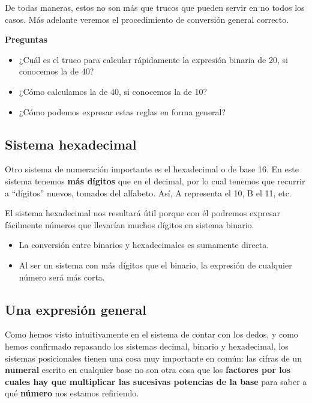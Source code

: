 \documentclass[spanish,a4paper,]{article}
\providecommand{\tightlist}{%
  \setlength{\itemsep}{0pt}\setlength{\parskip}{0pt}}
\begin{document}
De todas maneras, estos no son más que trucos que pueden servir en no
todos los casos. Más adelante veremos el procedimiento de conversión
general correcto.

\textbf{Preguntas}

\begin{itemize}
\tightlist
\item
  ¿Cuál es el truco para calcular rápidamente la expresión binaria de
  20, si conocemos la de 40?
\item
  ¿Cómo calculamos la de 40, si conocemos la de 10?
\item
  ¿Cómo podemos expresar estas reglas en forma general?
\end{itemize}

\hypertarget{sistema-hexadecimal}{%
\subsection{Sistema hexadecimal}\label{sistema-hexadecimal}}

Otro sistema de numeración importante es el hexadecimal o de base 16. En
este sistema tenemos \textbf{más dígitos} que en el decimal, por lo cual
tenemos que recurrir a ``dígitos'' nuevos, tomados del alfabeto. Así, A
representa el 10, B el 11, etc.

El sistema hexadecimal nos resultará útil porque con él podremos
expresar fácilmente números que llevarían muchos dígitos en sistema
binario.

\begin{itemize}
\tightlist
\item
  La conversión entre binarios y hexadecimales es sumamente directa.
\item
  Al ser un sistema con más dígitos que el binario, la expresión de
  cualquier número será más corta.
\end{itemize}

\hypertarget{una-expresiuxf3n-general}{%
\subsection{Una expresión general}\label{una-expresiuxf3n-general}}

Como hemos visto intuitivamente en el sistema de contar con los dedos, y
como hemos confirmado repasando los sistemas decimal, binario y
hexadecimal, los sistemas posicionales tienen una cosa muy importante en
común: las cifras de un \textbf{numeral} escrito en cualquier base no
son otra cosa que los \textbf{factores por los cuales hay que
multiplicar las sucesivas potencias de la base} para saber a qué
\textbf{número} nos estamos refiriendo.
\end{document}
